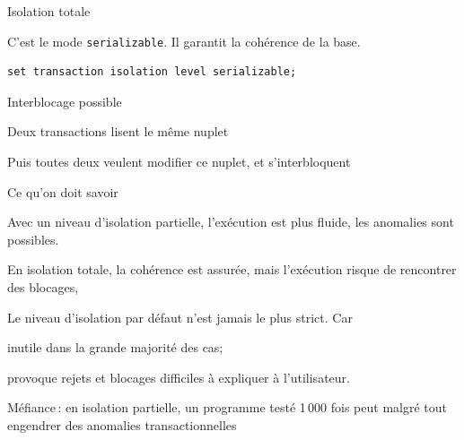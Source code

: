\begin{frame}[fragile]{Isolation totale}

C'est le mode \texttt{serializable}. Il
garantit  la cohérence de la base.

\vfill

\begin{verbatim}
set transaction isolation level serializable;
\end{verbatim}

\vfill

\alert{Interblocage possible}

\vfill


\begin{redbullet}
  \item Deux transactions lisent le même nuplet 
  
   \item Puis toutes deux veulent modifier ce nuplet, et s'interbloquent

\end{redbullet}
\end{frame}

\begin{frame}{Ce qu'on doit savoir }

Avec un niveau d'isolation partielle, l'exécution est plus fluide,  
les anomalies sont possibles.

\vfill

En isolation totale, la cohérence est assurée, mais l'exécution risque de rencontrer des blocages,
\vfill

\alert{Le niveau d'isolation par défaut n'est jamais le plus strict}. Car

\begin{redbullet}
  \item inutile dans la grande majorité des cas;
  \item provoque rejets et blocages difficiles à expliquer à l'utilisateur.  
\end{redbullet}

\vfill

\alert{Méfiance}\,: en isolation partielle, un programme testé 1\,000 fois
peut malgré tout engendrer des anomalies transactionnelles

\end{frame}
